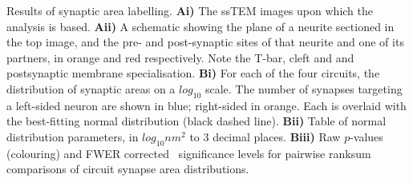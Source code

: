 Results of synaptic area labelling.
\textbf{Ai)} The ssTEM images upon which the analysis is based.
\textbf{Aii)} A schematic showing the plane of a neurite sectioned in the top image, and the pre- and post-synaptic sites of that neurite and one of its partners, in orange and red respectively.
Note the T-bar, cleft and and postsynaptic membrane specialisation.
\textbf{Bi)} For each of the four circuits, the distribution of synaptic areas on a $log_{10}$ scale.
The number of synapses targeting a left-sided neuron are shown in blue; right-sided in orange.
Each is overlaid with the best-fitting normal distribution (black dashed line).
\textbf{Bii)} Table of normal distribution parameters, in $log_{10}nm^2$ to 3 decimal places.
\textbf{Biii)} Raw $p$-values (colouring) and FWER corrected~\citep*{Holm1979} significance levels for pairwise ranksum comparisons of circuit synapse area distributions.